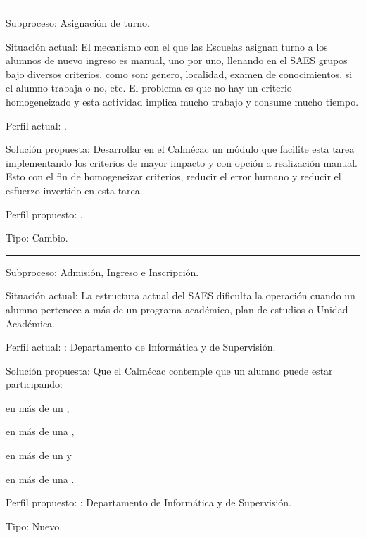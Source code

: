 \hrule
\vspace{0.2cm}
\begin{Cdescription}
	\item[Subproceso:] Asignación de turno.
	\item[Situación actual:] El mecanismo con el que las Escuelas asignan turno a los alumnos de nuevo ingreso es manual, uno por uno, llenando en el SAES grupos bajo diversos criterios, como son: genero, localidad, examen de conocimientos, si el alumno trabaja o no, etc. El problema es que no hay un criterio homogeneizado y esta actividad implica mucho trabajo y consume mucho tiempo.
	\item[Perfil actual:] .
	\item[Solución propuesta:] Desarrollar en el Calmécac un módulo que facilite esta tarea implementando los criterios de mayor impacto y con opción a realización manual. Esto con el fin de homogeneizar criterios, reducir el error humano y reducir el esfuerzo invertido en esta tarea.
	\item[Perfil propuesto:] .
	\item[Tipo:] Cambio.
\end{Cdescription}

\hrule
\vspace{0.2cm}
\begin{Cdescription}
	\item[Subproceso:] Admisión, Ingreso e Inscripción.
	\item[Situación actual:] La estructura actual del SAES dificulta la operación cuando un alumno pertenece a más de un programa académico, plan de estudios o Unidad Académica.
	\item[Perfil actual:] : Departamento de Informática y de Supervisión.
	\item[Solución propuesta:] Que el Calmécac contemple que un alumno puede estar participando:
	\begin{Citemize}
		\item en más de un , 
		\item en más de una , 
		\item en más de un  y 
		\item en más de una .
	\end{Citemize}
	\item[Perfil propuesto:] : Departamento de Informática y de Supervisión.
	\item[Tipo:] Nuevo.
\end{Cdescription}

